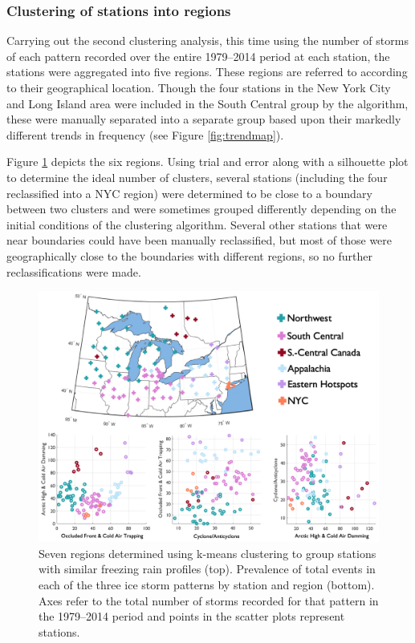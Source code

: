 \documentclass[twocol]{ametsoc}
\begin{document}
\subsubsection{Clustering of stations into regions}

Carrying out the second clustering analysis, this time using the number of storms of each pattern recorded over the entire 1979--2014 period at each station, the stations were aggregated into five regions. These regions are referred to according to their geographical location. Though the four stations in the New York City and Long Island area were included in the South Central group by the algorithm, these were manually separated into a separate group based upon their markedly different trends in frequency (see Figure \ref{fig:trendmap}). 



Figure \ref{fig:regional_breakdown} depicts the six regions. Using trial and error along with a silhouette plot to determine the ideal number of clusters, several stations (including the four reclassified into a NYC region) were determined to be close to a boundary between two clusters and were sometimes grouped differently depending on the initial conditions of the clustering algorithm. Several other stations that were near boundaries could have been manually reclassified, but most of those were geographically close to the boundaries with different regions, so no further reclassifications were made. 



\begin{figure}

\centering

\includegraphics[width=1\textwidth]{regional_Breakdown.png}

\caption{\label{fig:regional_breakdown} Seven regions determined using k-means clustering to group stations with similar freezing rain profiles (top). Prevalence of total events in each of the three ice storm patterns by station and region (bottom). Axes refer to the total number of storms recorded for that pattern in the 1979--2014 period and points in the scatter plots represent stations.}

\end{figure}
\end{document}

